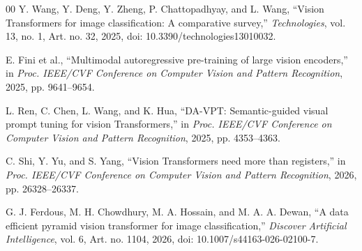 \documentclass[conference]{IEEEtran}
\begin{document}
\begin{thebibliography}{00}
Y. Wang, Y. Deng, Y. Zheng, P. Chattopadhyay, and L. Wang, ``Vision Transformers for image classification: A comparative survey,'' \textit{Technologies}, vol. 13, no. 1, Art. no. 32, 2025, doi: 10.3390/technologies13010032.

E. Fini et al., ``Multimodal autoregressive pre-training of large vision encoders,'' in \textit{Proc. IEEE/CVF Conference on Computer Vision and Pattern Recognition}, 2025, pp. 9641--9654.

L. Ren, C. Chen, L. Wang, and K. Hua, ``DA-VPT: Semantic-guided visual prompt tuning for vision Transformers,'' in \textit{Proc. IEEE/CVF Conference on Computer Vision and Pattern Recognition}, 2025, pp. 4353--4363.

C. Shi, Y. Yu, and S. Yang, ``Vision Transformers need more than registers,'' in \textit{Proc. IEEE/CVF Conference on Computer Vision and Pattern Recognition}, 2026, pp. 26328--26337.

G. J. Ferdous, M. H. Chowdhury, M. A. Hossain, and M. A. A. Dewan, ``A data efficient pyramid vision transformer for image classification,'' \textit{Discover Artificial Intelligence}, vol. 6, Art. no. 1104, 2026, doi: 10.1007/s44163-026-02100-7.

\end{thebibliography}
\end{document}
